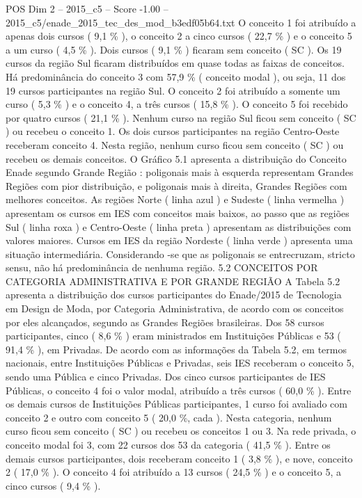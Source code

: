 \begin{textsample}{POS Dim 2 – 2015\_c5 – Score -1.00 – 2015\_c5/enade\_2015\_tec\_des\_mod\_b3edf05b64.txt}
O conceito 1 foi atribuído a apenas dois cursos ( 9,1 \% ), o conceito 2 a cinco cursos ( 22,7 \% ) e o conceito 5 a um curso ( 4,5 \% ).
Dois cursos ( 9,1 \% ) ficaram sem conceito ( SC ).
Os 19 cursos da região Sul ficaram distribuídos em quase todas as faixas de conceitos.
Há predominância do conceito 3 com 57,9 \% ( conceito modal ), ou seja, 11 dos 19 cursos participantes na região Sul.
O conceito 2 foi atribuído a somente um curso ( 5,3 \% ) e o conceito 4, a três cursos ( 15,8 \% ).
O conceito 5 foi recebido por quatro cursos ( 21,1 \% ).
Nenhum curso na região Sul ficou sem conceito ( SC ) ou recebeu o conceito 1.
Os dois cursos participantes na região Centro-Oeste receberam conceito 4.
Nesta região, nenhum curso ficou sem conceito ( SC ) ou recebeu os demais conceitos.
O Gráfico 5.1 apresenta a distribuição do Conceito Enade segundo Grande Região : poligonais mais à esquerda representam Grandes Regiões com pior distribuição, e poligonais mais à direita, Grandes Regiões com melhores conceitos.
As regiões Norte ( linha azul ) e Sudeste ( linha vermelha ) apresentam os cursos em IES com conceitos mais baixos, ao passo que as regiões Sul ( linha roxa ) e Centro-Oeste ( linha preta ) apresentam as distribuições com valores maiores.
Cursos em IES da região Nordeste ( linha verde ) apresenta uma situação intermediária.
Considerando -se que as poligonais se entrecruzam, stricto sensu, não há predominância de nenhuma região. 5.2 CONCEITOS POR CATEGORIA ADMINISTRATIVA E POR GRANDE REGIÃO A Tabela 5.2 apresenta a distribuição dos cursos participantes do Enade/2015 de Tecnologia em Design de Moda, por Categoria Administrativa, de acordo com os conceitos por eles alcançados, segundo as Grandes Regiões brasileiras.
Dos 58 cursos participantes, cinco ( 8,6 \% ) eram ministrados em Instituições Públicas e 53 ( 91,4 \% ), em Privadas.
De acordo com as informações da Tabela 5.2, em termos nacionais, entre Instituições Públicas e Privadas, seis IES receberam o conceito 5, sendo uma Pública e cinco Privadas.
Dos cinco cursos participantes de IES Públicas, o conceito 4 foi o valor modal, atribuído a três cursos ( 60,0 \% ).
Entre os demais cursos de Instituições Públicas participantes, 1 curso foi avaliado com conceito 2 e outro com conceito 5 ( 20,0 \%, cada ).
Nesta categoria, nenhum curso ficou sem conceito ( SC ) ou recebeu os conceitos 1 ou 3.
Na rede privada, o conceito modal foi 3, com 22 cursos dos 53 da categoria ( 41,5 \% ).
Entre os demais cursos participantes, dois receberam conceito 1 ( 3,8 \% ), e nove, conceito 2 ( 17,0 \% ).
O conceito 4 foi atribuído a 13 cursos ( 24,5 \% ) e o conceito 5, a cinco cursos ( 9,4 \% ).

\end{textsample}
